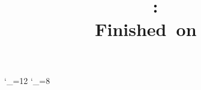 \newcommand{\exitProblemHeader}[1]{
    \nobreak\extramarks{Problem \arabic{#1} (continued)}{Problem \arabic{#1} continued on next page\ldots}\nobreak{}
    \stepcounter{#1}
    \nobreak\extramarks{Problem \arabic{#1}}{}\nobreak{}
}

\setcounter{secnumdepth}{0}
\setcounter{homeworkProblemCounter}{1}
\nobreak{}\nobreak{}

\newenvironment{homeworkProblem}{
    \section{Problem \arabic{homeworkProblemCounter}}
    \setcounter{section}{\arabic{homeworkProblemCounter}}
    \setcounter{partCounter}{1}
    \enterProblemHeader{homeworkProblemCounter}
}{
    \exitProblemHeader{homeworkProblemCounter}
}


%
%

\newcommand*{\myjobname}{}
\newcommand*{\setmyjobname}{%
  \edef\myjobname{\jobname}%
  \expandafter\expandafter\expandafter\setmyjobnameaux
    \expandafter\myjobname\expandafter"\myjobname"\relax
}
\newcommand*{\setmyjobnameaux}{}
\def\setmyjobnameaux#1"#2"#3\relax{\def\myjobname{#2}}
\setmyjobname


\makeatletter
\catcode`\_=12
\newcommand{\filenameparse}[1]{\expandafter\filename@parse@#1\@nil}
\def\filename@parse@#1_#2_#3\@nil{%
  \gdef\fileA{#1}%
  \gdef\fileB{#2}%
  \gdef\fileC{#3}%
}
\catcode`\_=8
\makeatother
\filenameparse{\myjobname}

%
%

\title{
    \vspace{0.5in}
    \textmd{\textbf{\hmwkClass: \hmwkTitle}}\\
    \normalsize\vspace{0.1in}\small{Finished\ on\ \hmwkDueDate\ }\\
   \vspace{0.1in}\large{\textit{\hmwkClassInstructor}}
    \vspace{3in}
\FloatBarrier
\begin{figure}[htb] 
\end{figure}
 \FloatBarrier
 \author{\textbf{\hmwkAuthorName}}
\date{\hmwkStudentID}
}


